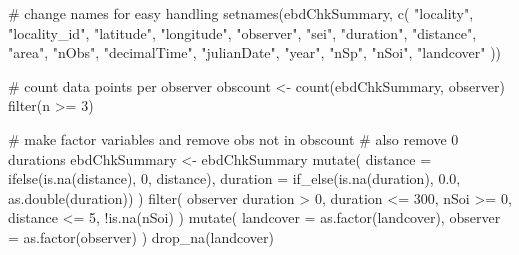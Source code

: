 \documentclass[
]{article}
\newenvironment{Shaded}{}{}
\newcommand{\CommentTok}[1]{\textcolor[rgb]{0.00,0.50,0.00}{#1}}
\newcommand{\DataTypeTok}[1]{#1}
\newcommand{\DecValTok}[1]{#1}
\newcommand{\FloatTok}[1]{#1}
\newcommand{\KeywordTok}[1]{\textcolor[rgb]{0.00,0.00,1.00}{#1}}
\newcommand{\NormalTok}[1]{#1}
\newcommand{\OperatorTok}[1]{#1}
\newcommand{\StringTok}[1]{\textcolor[rgb]{0.00,0.50,0.50}{#1}}
\begin{document}
\begin{Shaded}
\begin{Highlighting}[]
\CommentTok{# change names for easy handling}
\KeywordTok{setnames}\NormalTok{(ebdChkSummary, }\KeywordTok{c}\NormalTok{(}
  \StringTok{"locality"}\NormalTok{,}
  \StringTok{"locality_id"}\NormalTok{, }\StringTok{"latitude"}\NormalTok{, }\StringTok{"longitude"}\NormalTok{, }\StringTok{"observer"}\NormalTok{, }\StringTok{"sei"}\NormalTok{,}
  \StringTok{"duration"}\NormalTok{, }\StringTok{"distance"}\NormalTok{, }\StringTok{"area"}\NormalTok{, }\StringTok{"nObs"}\NormalTok{, }\StringTok{"decimalTime"}\NormalTok{, }\StringTok{"julianDate"}\NormalTok{,}
  \StringTok{"year"}\NormalTok{, }\StringTok{"nSp"}\NormalTok{, }\StringTok{"nSoi"}\NormalTok{, }\StringTok{"landcover"}
\NormalTok{))}

\CommentTok{# count data points per observer}
\NormalTok{obscount <-}\StringTok{ }\KeywordTok{count}\NormalTok{(ebdChkSummary, observer) }\OperatorTok{%
\StringTok{  }\KeywordTok{filter}\NormalTok{(n }\OperatorTok{>=}\StringTok{ }\DecValTok{3}\NormalTok{)}

\CommentTok{# make factor variables and remove obs not in obscount}
\CommentTok{# also remove 0 durations}
\NormalTok{ebdChkSummary <-}\StringTok{ }\NormalTok{ebdChkSummary }\OperatorTok{%
\StringTok{  }\KeywordTok{mutate}\NormalTok{(}
    \DataTypeTok{distance =} \KeywordTok{ifelse}\NormalTok{(}\KeywordTok{is.na}\NormalTok{(distance), }\DecValTok{0}\NormalTok{, distance),}
    \DataTypeTok{duration =} \KeywordTok{if_else}\NormalTok{(}\KeywordTok{is.na}\NormalTok{(duration), }\FloatTok{0.0}\NormalTok{, }\KeywordTok{as.double}\NormalTok{(duration))}
\NormalTok{  ) }\OperatorTok{%
\StringTok{  }\KeywordTok{filter}\NormalTok{(}
\NormalTok{    observer }\OperatorTok{%
\NormalTok{    duration }\OperatorTok{>}\StringTok{ }\DecValTok{0}\NormalTok{,}
\NormalTok{    duration }\OperatorTok{<=}\StringTok{ }\DecValTok{300}\NormalTok{,}
\NormalTok{    nSoi }\OperatorTok{>=}\StringTok{ }\DecValTok{0}\NormalTok{,}
\NormalTok{    distance }\OperatorTok{<=}\StringTok{ }\DecValTok{5}\NormalTok{,}
    \OperatorTok{!}\KeywordTok{is.na}\NormalTok{(nSoi)}
\NormalTok{  ) }\OperatorTok{%
\StringTok{  }\KeywordTok{mutate}\NormalTok{(}
    \DataTypeTok{landcover =} \KeywordTok{as.factor}\NormalTok{(landcover),}
    \DataTypeTok{observer =} \KeywordTok{as.factor}\NormalTok{(observer)}
\NormalTok{  ) }\OperatorTok{%
\StringTok{  }\KeywordTok{drop_na}\NormalTok{(landcover)}

}}}}}}
\end{Highlighting}
\end{Shaded}
\end{document}
